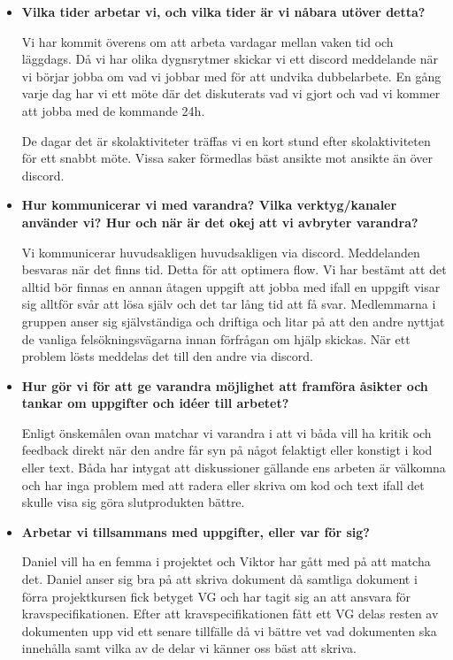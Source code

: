 \documentclass{mall}
\begin{document}
\begin{itemize}
\item \textbf{Vilka tider arbetar vi, och vilka tider är vi nåbara utöver detta?}

  Vi har kommit överens om att arbeta vardagar mellan vaken tid och läggdags. Då vi har olika dygnsrytmer skickar vi ett discord meddelande när vi börjar jobba om vad vi jobbar med för att undvika dubbelarbete. En gång varje dag har vi ett möte där det diskuterats vad vi gjort och vad vi kommer att jobba med de kommande 24h.

  De dagar det är skolaktiviteter träffas vi en kort stund efter skolaktiviteten för ett snabbt möte. Vissa saker förmedlas bäst ansikte mot ansikte än över discord.

\item \textbf{Hur kommunicerar vi med varandra? Vilka verktyg/kanaler använder vi? Hur och när är det okej att vi avbryter varandra?}

  Vi kommunicerar huvudsakligen huvudsakligen via discord. Meddelanden besvaras när det finns tid. Detta för att optimera flow. Vi har bestämt att det alltid bör finnas en annan åtagen uppgift att jobba med ifall en uppgift visar sig alltför svår att lösa själv och det tar lång tid att få svar.  Medlemmarna i gruppen anser sig självständiga och driftiga och litar på att den andre nyttjat de vanliga felsökningsvägarna innan förfrågan om hjälp skickas. När ett problem lösts meddelas det till den andre via discord.


  \item \textbf{Hur gör vi för att ge varandra möjlighet att framföra åsikter och tankar om uppgifter och idéer till arbetet?}

Enligt önskemålen ovan matchar vi varandra i att vi båda vill ha kritik och feedback direkt när den andre får syn på något felaktigt eller konstigt i kod eller text. Båda har intygat att diskussioner gällande ens arbeten är välkomna och har inga problem med att radera eller skriva om kod och text ifall det skulle visa sig göra slutprodukten bättre. 

\item \textbf{Arbetar vi tillsammans med uppgifter, eller var för sig?}

  Daniel vill ha en femma i projektet och Viktor har gått med på att matcha det. Daniel anser sig bra på att skriva dokument då samtliga dokument i förra projektkursen fick betyget VG och har tagit sig an att ansvara för kravspecifikationen. Efter att kravspecifikationen fått ett VG delas resten av dokumenten upp vid ett senare tillfälle då vi bättre vet vad dokumenten ska innehålla samt vilka av de delar vi känner oss bäst att skriva.



\end{itemize}
\end{document}
